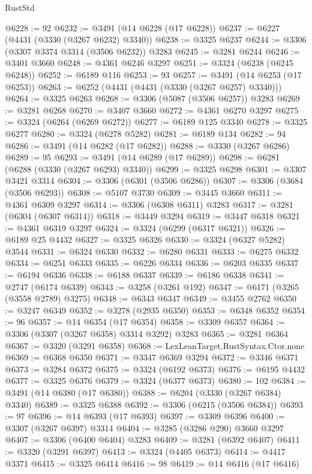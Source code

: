 \begin{lexlean}{RustStd}
\begin{coremodule}
@6228 := 92
@6232 := @3491 (@14 @6228 (@17 @6228))
@6237 := @6227 (@4431 (@3330 (@3267 @6232) @3340))
@6238 := @3325 @6237
@6244 := @3306 (@3307 @3374 @3314 (@3506 @6232)) @3283
@6245 := @3281 @6244
@6246 := @3401 @3660
@6248 := @4361 @6246 @3297
@6251 := @3324 (@6238 (@6245 @6248))
@6252 := @6189 @116
@6253 := 93
@6257 := @3491 (@14 @6253 (@17 @6253))
@6263 := @6252 (@4431 (@4431 (@3330 (@3267 @6257) @3340)))
@6264 := @3325 @6263
@6268 := @3306 (@5087 (@3506 @6257)) @3283
@6269 := @3281 @6268
@6270 := @3407 @3660
@6272 := @4361 @6270 @3297
@6275 := @3324 (@6264 (@6269 @6272))
@6277 := @6189 @125 @3340
@6278 := @3325 @6277
@6280 := @3324 (@6278 @5282)
@6281 := @6189 @134
@6282 := 94
@6286 := @3491 (@14 @6282 (@17 @6282))
@6288 := @3330 (@3267 @6286)
@6289 := 95
@6293 := @3491 (@14 @6289 (@17 @6289))
@6298 := @6281 (@6288 (@3330 (@3267 @6293) @3340))
@6299 := @3325 @6298
@6301 := @3307 @3421 @3314
@6304 := @3306 (@6301 (@3506 @6286))
@6307 := @3306 (@3684 (@3506 @6293))
@6308 := @5107 @3730
@6309 := @3445 @3660
@6311 := @4361 @6309 @3297
@6314 := @3306 (@6308 @6311) @3283
@6317 := @3281 (@6304 (@6307 @6314))
@6318 := @3449 @3294
@6319 := @3447 @6318
@6321 := @4361 @6319 @3297
@6324 := @3324 (@6299 (@6317 @6321))
@6326 := @6189 @25 @4432
@6327 := @3325 @6326
@6330 := @3324 (@6327 @5282) @3544
@6331 := @6324 @6330
@6332 := @6280 @6331
@6333 := @6275 @6332
@6334 := @6251 @6333
@6335 := @6226 @6334
@6336 := @6203 @6335
@6337 := @6194 @6336
@6338 := @6188 @6337
@6339 := @6186 @6338
@6341 := @2747 (@6174 @6339)
@6343 := @3258 (@3261 @192)
@6347 := @6171 (@3265 (@3558 @2789) @3275)
@6348 := @6343 @6347
@6349 := @3455 @2762
@6350 := @3247 @6349
@6352 := @3278 (@2935 @6350)
@6353 := @6348 @6352
@6354 := 96
@6357 := @14 @6354 (@17 @6354)
@6358 := @3309 @6357
@6364 := @3306 (@3307 (@3267 @6358) @3314 @3292) @3283
@6365 := @3281 @6364
@6367 := @3320 (@3291 @6358)
@6368 := LexLeanTarget.RustSyntax.Ctor.none
@6369 := @6368 @6350
@6371 := @3347 @6369 @3294
@6372 := @3346 @6371
@6373 := @3284 @6372
@6375 := @3324 (@6192 @6373)
@6376 := @6195 @4432
@6377 := @3325 @6376
@6379 := @3324 (@6377 @6373)
@6380 := 102
@6384 := @3491 (@14 @6380 (@17 @6380))
@6388 := @6204 (@3330 (@3267 @6384) @3340)
@6389 := @3325 @6388
@6392 := @3306 (@6215 (@3506 @6384))
@6393 := 97
@6396 := @14 @6393 (@17 @6393)
@6397 := @3309 @6396
@6400 := @3307 (@3267 @6397) @3314
@6404 := @3285 (@3286 @290) @3660 @3297
@6407 := @3306 (@6400 @6404) @3283
@6409 := @3281 (@6392 @6407)
@6411 := @3320 (@3291 @6397)
@6413 := @3324 (@4405 @6373)
@6414 := @4417 @3371
@6415 := @3325 @6414
@6416 := 98
@6419 := @14 @6416 (@17 @6416)

\end{coremodule}
\end{lexlean}
